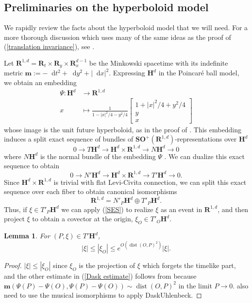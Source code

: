 \documentclass[reqno,10pt]{amsart}
\newcommand{\RR}{\mathbf{R}}
\newcommand{\Hyp}{\mathbf H}
\newcommand{\SpOrth}{\mathbf{SO}}
\newcommand{\Mink}{\mathbf m}
\newcommand*\dif{\mathop{}\!\mathrm{d}}
\DeclareMathOperator{\dist}{dist}
\newtheorem{lemma}[theorem]{Lemma}
\theoremstyle{definition}
\numberwithin{equation}{section}
\begin{document}
\subsection{Preliminaries on the hyperboloid model}
We rapidly review the facts about the hyperboloid model that we will need.
For a more thorough discussion which uses many of the same ideas as the proof of (\ref{translation invariance}), see \cite[\S3.1]{daskalopoulosPrep1}.

Let $\RR^{1, d} = \RR_t \times \RR_y \times \RR_x^{d - 1}$ be the Minkowski spacetime with its indefinite metric $\Mink := -\dif t^2 + \dif y^2 + |\dif x|^2$.
Expressing $\Hyp^d$ in the Poincar\'e ball model, we obtain an embedding 
\begin{align*}
\Psi: \Hyp^d &\to \RR^{1, d} \\
x &\mapsto \frac{1}{1 - |x|^2/4 - y^2/4} \begin{bmatrix}1 + |x|^2/4 + y^2/4\\y \\ x\end{bmatrix}
\end{align*}
whose image is the unit future hyperboloid, as in the proof of \cite[Proposition 3.5]{lee1997riemannian}.
This embedding induces a split exact sequence of bundles of $\SpOrth^+(\RR^{1, d})$-representations over $\Hyp^d$
$$0 \to T\Hyp^d \to \Hyp^d \times \RR^{1, d} \to N\Hyp^d \to 0$$
where $N\Hyp^d$ is the normal bundle of the embedding $\Psi$ \cite[(3.4)]{daskalopoulosPrep1}.
We can dualize this exact sequence to obtain 
$$0 \to N' \Hyp^d \to \Hyp^d \times \RR^{1, d} \to T' \Hyp^d \to 0.$$
Since $\Hyp^d \times \RR^{1, d}$ is trivial with flat Levi-Civita connection, we can split this exact sequence over each fiber to obtain canonical isomorphisms
\begin{equation}\label{SES}
\RR^{1, d} = N'_P \Hyp^d \oplus T'_P \Hyp^d.
\end{equation}
Thus, if $\xi \in T'_P \Hyp^d$ we can apply (\ref{SES}) to realize $\xi$ as an event in $\RR^{1, d}$, and then project $\xi$ to obtain a covector at the origin, $\xi_O \in T'_O \Hyp^d$.

\begin{lemma}
For $(P, \xi) \in T' \Hyp^d$,
\begin{equation}\label{Dask estimate}
|\xi| \leq |\xi_O| \leq e^{O(\dist(O, P)^2)} |\xi|.
\end{equation}
\end{lemma}
\begin{proof}
$|\xi| \leq |\xi_O|$ since $\xi_O$ is the projection of $\xi$ which forgets the timelike part, and the other estimate in (\ref{Dask estimate}) follows from \cite[Lemma 4.2]{daskalopoulosPrep1} because $\Mink(\Psi(P) - \Psi(O), \Psi(P) - \Psi(O)) \sim \dist(O, P)^2$ in the limit $P \to 0$.
 also need to use the musical isomorphisms to apply DaskUhlenbeck.
\end{proof}
\end{document}
